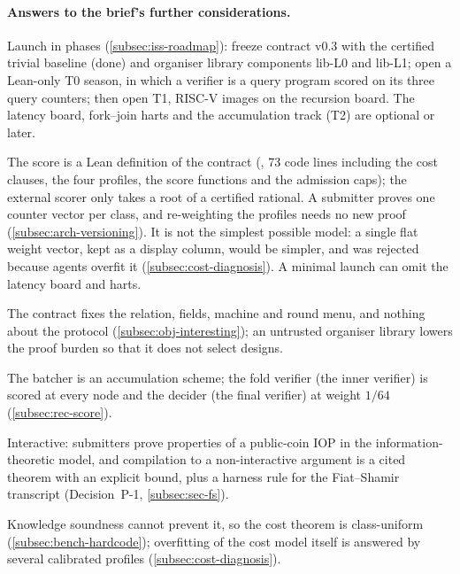\paragraph{Answers to the brief's further considerations.}
\begin{description}[leftmargin=0pt,itemsep=2pt]
\item[MVP scope.] Launch in phases (\cref{subsec:iss-roadmap}): freeze contract v0.3 with the
  certified trivial baseline (done) and organiser library components lib-L0 and lib-L1; open a
  Lean-only T0 season, in which a verifier is a query program scored on its three query counters;
  then open T1, RISC-V images on the recursion board. The latency board, fork--join harts and the
  accumulation track (T2) are optional or later.
\item[An easy-to-implement cost function.] The score is a Lean definition of the contract
  (, 73 code lines including the cost clauses, the four profiles, the score
  functions and the admission caps); the external scorer only takes a root of a certified rational.
  A submitter proves one counter vector per class, and re-weighting the profiles needs no new proof
  (\cref{subsec:arch-versioning}). It is not the simplest possible model: a single flat weight
  vector, kept as a display column, would be simpler, and was rejected because agents overfit it
  (\cref{subsec:cost-diagnosis}). A minimal launch can omit the latency board and harts.
\item[Design-space exploration.] The contract fixes the relation, fields, machine and round menu,
  and nothing about the protocol (\cref{subsec:obj-interesting}); an untrusted organiser library
  lowers the proof burden so that it does not select designs.
\item[Inner versus final verifier.] The batcher is an accumulation scheme; the fold verifier (the
  inner verifier) is scored at every node and the decider (the final verifier) at weight $1/64$
  (\cref{subsec:rec-score}).
\item[Interactive or non-interactive.] Interactive: submitters prove properties of a public-coin IOP
  in the information-theoretic model, and compilation to a non-interactive argument is a cited
  theorem with an explicit bound, plus a harness rule for the Fiat--Shamir transcript (Decision~P-1,
  \cref{subsec:sec-fs}).
\item[Overfitting.] Knowledge soundness cannot prevent it, so the cost theorem is class-uniform
  (\cref{subsec:bench-hardcode}); overfitting of the cost model itself is answered by several
  calibrated profiles (\cref{subsec:cost-diagnosis}).
\end{description}

